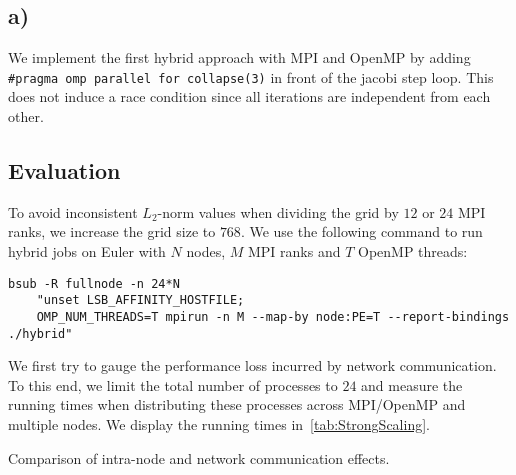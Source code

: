 \documentclass[11pt]{article}
\begin{document}
    \subsection*{a)}
    \label{subsec:Task2a}

    We implement the first hybrid approach with MPI and OpenMP by adding
    \lstinline{#pragma omp parallel for collapse(3)} in front of the jacobi
    step loop.
    This does not induce a race condition since all iterations are
    independent from each other.

    \subsection*{Evaluation}
    \label{subsec:Task2Eval}

    To avoid inconsistent $L_2$-norm values when dividing the grid by $12$ or
    $24$ MPI ranks, we increase the grid size to $768$.
    We use the following command to run hybrid jobs on Euler with $N$ nodes,
    $M$ MPI ranks and $T$ OpenMP threads:

    \begin{lstlisting}[basicstyle=\tiny]
    bsub -R fullnode -n 24*N
    "unset LSB_AFFINITY_HOSTFILE;
    OMP_NUM_THREADS=T mpirun -n M --map-by node:PE=T --report-bindings ./hybrid"
    \end{lstlisting}

    We first try to gauge the performance loss incurred by network
    communication.
    To this end, we limit the total number of processes to $24$ and measure
    the running times when distributing these processes across MPI/OpenMP
    and multiple nodes.
    We display the running times in~\cref{tab:StrongScaling}.

    \begin{table}
        \caption{Comparison of intra-node and network communication effects.}
        \label{tab:StrongScaling}
        \vspace{.25cm}
        \begin{center}
            \resizebox{\textwidth}{!}{  }
        \end{center}
    \end{table}
\end{document}

